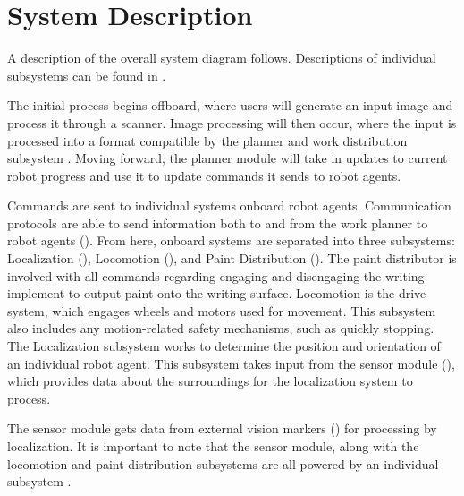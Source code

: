
\section{System Description}
\label{sec:system_description}


A description of the overall system diagram follows. Descriptions of individual subsystems can be found in .

The initial process begins offboard, where users will generate an input image and process it through a scanner. Image processing will then occur, where the input is processed into a format compatible by the planner and work distribution subsystem . Moving forward, the planner module will take in updates to current robot progress and use it to update commands it sends to robot agents.

Commands are sent to individual systems onboard robot agents. Communication protocols are able to send information both to and from the work planner to robot agents (). From here, onboard systems are separated into three subsystems: Localization (), Locomotion (), and Paint Distribution (). The paint distributor is involved with all commands regarding engaging and disengaging the writing implement to output paint onto the writing surface. Locomotion is the drive system, which engages wheels and motors used for movement. This subsystem also includes any motion-related safety mechanisms, such as quickly stopping. The Localization subsystem works to determine the position and orientation of an individual robot agent. This subsystem takes input from the sensor module (), which provides data about the surroundings for the localization system to process.

The sensor module gets data from external vision markers () for processing by localization. It is important to note that the sensor module, along with the locomotion and paint distribution subsystems are all powered by an individual subsystem .